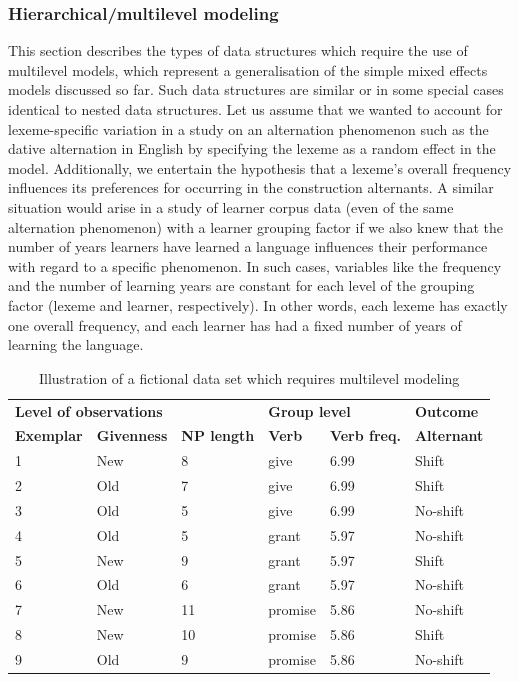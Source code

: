 \subsubsection{Hierarchical\slash multilevel modeling}
\label{sec:hierarchicalormultilevelmodels}

This section describes the types of data structures which require the use of multilevel models, which represent a generalisation of the simple mixed effects models discussed so far.
Such data structures are similar or in some special cases identical to nested data structures.
Let us assume that we wanted to account for lexeme-specific variation in a study on an alternation phenomenon such as the dative alternation in English by specifying the lexeme as a random effect in the model.
Additionally, we entertain the hypothesis that a lexeme's overall frequency influences its preferences for occurring in the construction alternants.
A similar situation would arise in a study of learner corpus data (even of the same alternation phenomenon) with a learner grouping factor if we also knew that the number of years learners have learned a language influences their performance with regard to a specific phenomenon.
In such cases, variables like the frequency and the number of learning years are constant for each level of the grouping factor (lexeme and learner, respectively).
In other words, each lexeme has exactly one overall frequency, and each learner has had a fixed number of years of learning the language.

\begin{table}
  \centering
  \begin{tabular}{llllll}
    \toprule
    \multicolumn{3}{l}{\textbf{Level of observations}}          & \multicolumn{2}{l}{\textbf{Group level}}  & \textbf{Outcome} \\
    \textbf{Exemplar} & \textbf{Givenness} & \textbf{NP length} & \textbf{Verb} & \textbf{Verb freq.}       & \textbf{Alternant}\\
    \midrule
            1 &     New   &      8    &    give   &   6.99   & Shift \\
            2 &     Old   &      7    &    give   &   6.99   & Shift \\
            3 &     Old   &      5    &    give   &   6.99   & No-shift \\
            4 &     Old   &      5    &    grant  &   5.97   & No-shift \\
            5 &     New   &      9    &    grant  &   5.97   & Shift \\
            6 &     Old   &      6    &    grant  &   5.97   & No-shift \\
            7 &     New   &      11   &   promise &   5.86   & No-shift \\
            8 &     New   &      10   &   promise &   5.86   & Shift \\
            9 &     Old   &      9    &   promise &   5.86   & No-shift \\
    \bottomrule
  \end{tabular}
  \caption{Illustration of a fictional data set which requires multilevel modeling}
  \label{tab:multilevel}
\end{table}

